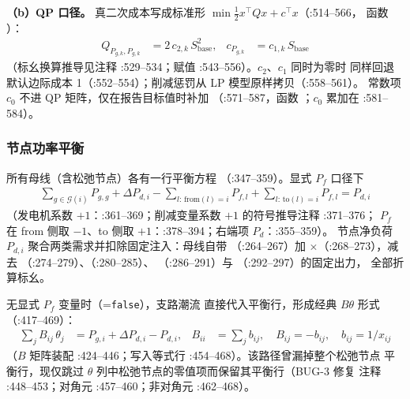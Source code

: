 \textbf{（b）QP 口径。} 真二次成本写成标准形
$\min \tfrac12 x^{\top}Qx+c^{\top}x$（:514--566，
函数 ）：
\begin{align*}
Q_{P_{g,k},P_{g,k}} &= 2\,c_{2,k}\,S_{\mathrm{base}}^{2},
& c_{P_{g,k}} &= c_{1,k}\,S_{\mathrm{base}}
\end{align*}
（标幺换算推导见注释 :529--534；赋值 :543--556）。$c_2$、$c_1$ 同时为零时
同样回退默认边际成本 1（:552--554）；削减惩罚从 LP 模型原样拷贝（:558--561）。
常数项 $c_0$ 不进 QP 矩阵，仅在报告目标值时补加
（:571--587，函数 ；$c_0$ 累加在 :581--584）。

\subsubsection*{节点功率平衡}
所有母线（含松弛节点）各有一行平衡方程
（:347--359）。显式 $P_f$ 口径下
\begin{align*}
\sum_{g\in\mathcal{G}(i)} P_{g,g} + \Delta P_{d,i}
- \sum_{l:\,\mathrm{from}(l)=i} P_{f,l} + \sum_{l:\,\mathrm{to}(l)=i} P_{f,l}
= P_{d,i}
\end{align*}
（发电机系数 $+1$：:361--369；削减变量系数 $+1$ 的符号推导注释 :371--376；
$P_f$ 在 from 侧取 $-1$、to 侧取 $+1$：:378--394；右端项 $P_d$：:355--359）。
节点净负荷 $P_{d,i}$ 聚合两类需求并扣除固定注入：母线自带 
（:264--267）加 $\times$（:268--273），减去
（:274--279）、（:280--285）、
（:286--291）与 （:292--297）的固定出力，
全部折算标幺。

无显式 $P_f$ 变量时（=\texttt{false}），支路潮流
直接代入平衡行，形成经典 $B\theta$ 形式（:417--469）：
\begin{align*}
\sum_{j} B_{ij}\,\theta_j &= P_{g,i}+\Delta P_{d,i}-P_{d,i},
& B_{ii} &= \textstyle\sum_{j} b_{ij},\quad B_{ij}=-b_{ij},\quad b_{ij}=1/x_{ij}
\end{align*}
（$B$ 矩阵装配 :424--446；写入等式行 :454--468）。该路径曾漏掉整个松弛节点
平衡行，现仅跳过 $\theta$ 列中松弛节点的零值项而保留其平衡行（BUG-3 修复
注释 :448--453；对角元 :457--460；非对角元 :462--468）。

